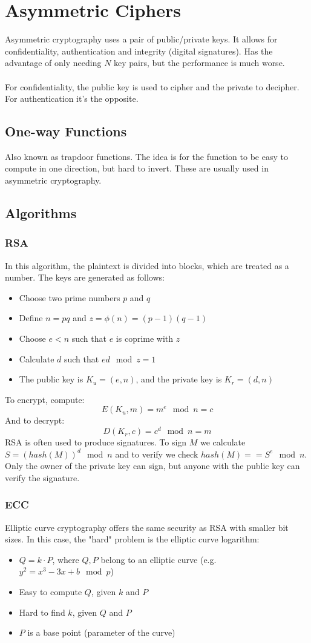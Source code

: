 \documentclass[10pt,a4paper]{report}
\begin{document}
\section{Asymmetric Ciphers}
Asymmetric cryptography uses a pair of public/private keys. It allows for confidentiality, authentication and integrity (digital signatures). Has the advantage of only needing $N$ key pairs, but the performance is much worse.\\
\\
For confidentiality, the public key is used to cipher and the private to decipher. For authentication it's the opposite.
\subsection{One-way Functions}
Also known as trapdoor functions. The idea is for the function to be easy to compute in one direction, but hard to invert. These are usually used in asymmetric cryptography.
\subsection{Algorithms}
\subsubsection{RSA}
In this algorithm, the plaintext is divided into blocks, which are treated as a number. The keys are generated as follows:
\begin{itemize}
\item Choose two prime numbers $p$ and $q$
\item Define $n = pq$ and $z = \phi(n) = (p-1)(q-1)$
\item Choose $e < n$ such that $e$ is coprime with $z$
\item Calculate $d$ such that $ed \mod z = 1$
\item The public key is $K_u = (e, n)$, and the private key is $K_r = (d, n)$
\end{itemize}
To encrypt, compute:
$$
E(K_u, m) = m^e \mod n = c
$$
And to decrypt:
$$
D(K_r, c) = c^d \mod n = m
$$
RSA is often used to produce signatures. To sign $M$ we calculate $S = (hash(M))^d \mod n$ and to verify we check $hash(M) == S^e \mod n$. Only the owner of the private key can sign, but anyone with the public key can verify the signature.
\subsubsection{ECC}
Elliptic curve cryptography offers the same security as RSA with smaller bit sizes. In this case, the "hard" problem is the elliptic curve logarithm:
\begin{itemize}
\item $Q = k \cdot P$, where $Q, P$ belong to an elliptic curve (e.g. $y^2 = x^3 - 3x + b \mod p$)
\item Easy to compute $Q$, given $k$ and $P$
\item Hard to find $k$, given $Q$ and $P$
\item $P$ is a base point (parameter of the curve)
\end{itemize}
\end{document}
